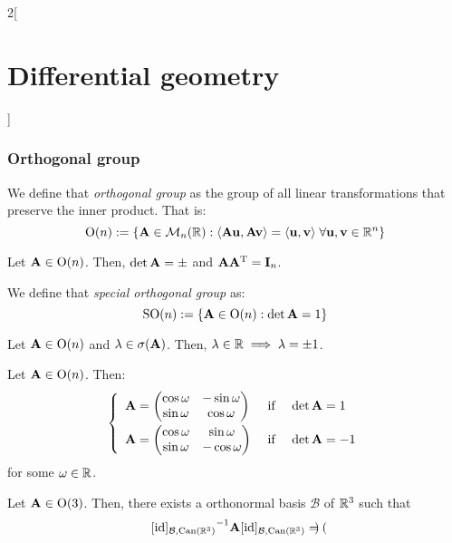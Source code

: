 \documentclass[../../../main.tex]{subfiles}
\begin{document}
\begin{multicols}{2}[\section{Differential geometry}]
  \subsubsection{Orthogonal group}
  \begin{definition}
    We define that \emph{orthogonal group} as the group of all linear transformations that preserve the inner product. That is: $$\text{O}(n):=\{\vf{A}\in\mathcal{M}_n(\RR):\langle\vf{Au},\vf{Av}\rangle=\langle\vf{u},\vf{v}\rangle\;\forall\vf{u},\vf{v}\in\RR^n\}$$
  \end{definition}
  \begin{proposition}
    Let $\vf{A}\in\text{O}(n)$. Then, $\det\vf{A}=\pm$ and $\vf{A}\transpose{A}=\vf{I}_n$.
  \end{proposition}
  \begin{definition}
    We define that \emph{special orthogonal group} as: $$\text{SO}(n):=\{\vf{A}\in\text{O}(n):\det\vf{A}=1\}$$
  \end{definition}
  \begin{lemma}
    Let $\vf{A}\in\text{O}(n)$ and $\lambda\in\sigma(\vf{A})$. Then, $\lambda\in\RR\implies\lambda=\pm 1$.
  \end{lemma}
  \begin{proposition}
    Let $\vf{A}\in\text{O}(n)$. Then:
    $$\left\{
      \begin{array}{lll}
        \vspace{0.1cm}
        \vf{A}=\begin{pmatrix}
          \cos\omega & -\sin\omega \\
          \sin\omega & \cos\omega  \\
        \end{pmatrix} &
        \text{ if }                       & \det\vf{A}=1  \\
        \vf{A}=\begin{pmatrix}
          \cos\omega & \sin\omega  \\
          \sin\omega & -\cos\omega \\
        \end{pmatrix} &
        \text{ if }                       & \det\vf{A}=-1
      \end{array}
      \right.
    $$
    for some $\omega\in\RR$.
  \end{proposition}
  \begin{proposition}
    Let $\vf{A}\in\text{O}(3)$. Then, there exists a orthonormal basis $\mathcal{B}$ of $\RR^3$ such that $${[\id]_{\mathcal{B},\text{Can}(\RR^3)}}^{-1}\vf{A}[\id]_{\mathcal{B},\text{Can}(\RR^3)}=\begin{pmatrix}

\end{pmatrix}$$
\end{proposition}
\end{multicols}
\end{document}
